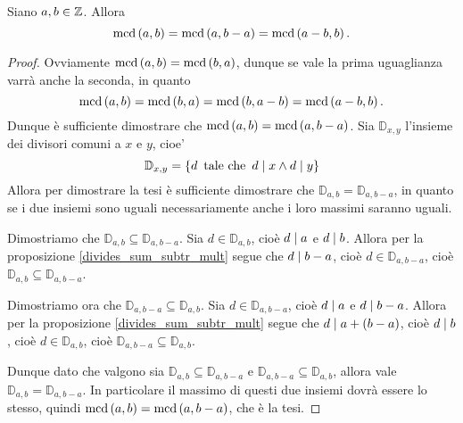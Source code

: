 \begin{theorem} \label{mcd_a_a-b}
    Siano $a, b \in \mathbb{Z}$. Allora
    \begin{equation}
        \operatorname{mcd}\left(a, b\right) = \operatorname{mcd}\left(a, b - a\right) = \operatorname{mcd}\left(a - b, b\right).
    \end{equation} 
\end{theorem}
\begin{proof}  
    Ovviamente $\operatorname{mcd}\left(a, b\right) = \operatorname{mcd}\left(b, a\right)$, dunque se vale la prima uguaglianza varrà anche la seconda,
    in quanto 
    \[
       \operatorname{mcd}\left(a, b\right) = \operatorname{mcd}\left(b, a\right) = \operatorname{mcd}\left(b, a - b\right) = \operatorname{mcd}\left(a - b, b\right).
    \] 
    Dunque è sufficiente
    dimostrare che $\operatorname{mcd}\left(a, b\right) = \operatorname{mcd}\left(a, b - a\right)$.
    Sia $\mathbb{D}_{x, y}$ l'insieme dei divisori comuni a $x$ e $y$, cioe'
    \[
        \mathbb{D}_{x, y} = \left\{d \operatorname{\text{ tale che }} d \mid x \land d \mid y \right\}  
    \]
    Allora per dimostrare la tesi è sufficiente dimostrare che $\mathbb{D}_{a, b} = \mathbb{D}_{a, b - a}$, in quanto
    se i due insiemi sono uguali necessariamente anche i loro massimi saranno uguali.

    Dimostriamo che $\mathbb{D}_{a, b} \subseteq \mathbb{D}_{a, b - a}$. Sia $d \in \mathbb{D}_{a, b}$, 
    cioè $d \mid a$ e $d \mid b$. Allora per la proposizione \ref{divides_sum_subtr_mult} segue che
    $d \mid b - a$, cioè $d \in \mathbb{D}_{a, b - a}$, 
    cioè $\mathbb{D}_{a, b} \subseteq \mathbb{D}_{a, b - a}$.

    Dimostriamo ora che $\mathbb{D}_{a, b - a} \subseteq \mathbb{D}_{a, b}$. 
    Sia $d \in \mathbb{D}_{a, b - a}$, 
    cioè $d \mid a$ e $d \mid b - a$. Allora per la proposizione \ref{divides_sum_subtr_mult} segue che
    $d \mid a + (b - a)$, cioè $d \mid b$, cioè $d \in \mathbb{D}_{a, b}$, 
    cioè $\mathbb{D}_{a, b - a} \subseteq \mathbb{D}_{a, b}$.

    Dunque dato che valgono sia $\mathbb{D}_{a, b} \subseteq \mathbb{D}_{a, b - a}$ e 
    $\mathbb{D}_{a, b - a} \subseteq \mathbb{D}_{a, b}$, allora vale
     $\mathbb{D}_{a, b} = \mathbb{D}_{a, b - a}$. In particolare il massimo di questi due insiemi
     dovrà essere lo stesso, quindi $\operatorname{mcd}\left(a, b\right) = \operatorname{mcd}\left(a, b - a\right)$, che è la tesi.
\end{proof}

